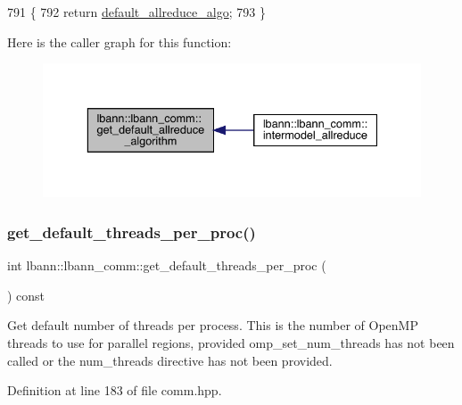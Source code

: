 \begin{DoxyCode}
791                                                               \{
792     \textcolor{keywordflow}{return} \hyperlink{classlbann_1_1lbann__comm_ac7731d6bcdb6775009467cf4138d4bab}{default\_allreduce\_algo};
793   \}
\end{DoxyCode}
Here is the caller graph for this function\+:\nopagebreak
\begin{figure}[H]
\begin{center}
\leavevmode
\includegraphics[width=336pt]{classlbann_1_1lbann__comm_aafcb505629dd550ebd0b2c41792aca27_icgraph}
\end{center}
\end{figure}
\mbox{\label{classlbann_1_1lbann__comm_a3c60c211a663801b57197dddf58356da}} 
\subsubsection{\texorpdfstring{get\+\_\+default\+\_\+threads\+\_\+per\+\_\+proc()}{get\_default\_threads\_per\_proc()}}
{\footnotesize\ttfamily int lbann\+::lbann\+\_\+comm\+::get\+\_\+default\+\_\+threads\+\_\+per\+\_\+proc (\begin{DoxyParamCaption}{ }\end{DoxyParamCaption}) const\hspace{0.3cm}{\ttfamily [inline]}}

Get default number of threads per process. This is the number of Open\+MP threads to use for parallel regions, provided omp\+\_\+set\+\_\+num\+\_\+threads has not been called or the num\+\_\+threads directive has not been provided. 

Definition at line 183 of file comm.\+hpp.



